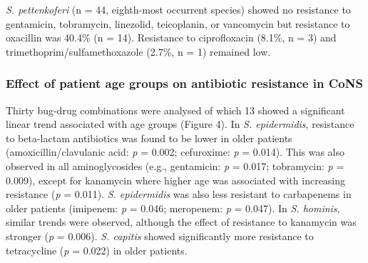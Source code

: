 \documentclass[
]{book}
\begin{document}
\emph{S. pettenkoferi} (n = 44, eighth-most occurrent species) showed no resistance to gentamicin, tobramycin, linezolid, teicoplanin, or vancomycin but resistance to oxacillin was 40.4\% (n = 14). Resistance to ciprofloxacin (8.1\%, n = 3) and trimethoprim/sulfamethoxazole (2.7\%, n = 1) remained low.

\hypertarget{effect-of-patient-age-groups-on-antibiotic-resistance-in-cons}{%
\subsubsection{Effect of patient age groups on antibiotic resistance in CoNS}\label{effect-of-patient-age-groups-on-antibiotic-resistance-in-cons}}

Thirty bug-drug combinations were analysed of which 13 showed a significant linear trend associated with age groups (Figure 4). In \emph{S. epidermidis}, resistance to beta-lactam antibiotics was found to be lower in older patients (amoxicillin/clavulanic acid: \emph{p} = 0.002; cefuroxime: \emph{p} = 0.014). This was also observed in all aminoglycosides (e.g., gentamicin: \emph{p} = 0.017; tobramycin: \emph{p} = 0.009), except for kanamycin where higher age was associated with increasing resistance (\emph{p} = 0.011). \emph{S. epidermidis} was also less resistant to carbapenems in older patients (imipenem: \emph{p} = 0.046; meropenem: \emph{p} = 0.047). In \emph{S. hominis}, similar trends were observed, although the effect of resistance to kanamycin was stronger (\emph{p} = 0.006). \emph{S. capitis} showed significantly more resistance to tetracycline (\emph{p} = 0.022) in older patients.
\end{document}
